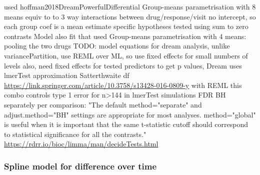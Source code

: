 \begin{outline}
\1 used  hoffman2018DreamPowerfulDifferential
\1 Group-means parametrisation with 8 means
    \2 equiv to to 3 way interactions between drug/response/visit
    \2 no intercept, so each group coef is a mean estimate
\1 specific hypotheses tested using sum to zero contrasts 
\1 Model also fit that used Group-means parametrisation with 4 means: pooling the two drugs
\1 TODO: model equations
    \2 for dream analysis, unlike variancePartition, use REML over ML, so use fixed effects for small numbers of levels
    \2 also, need fixed effects for tested predictors
    \2 to get p values, Dream uses lmerTest approximation Satterthwaite df \url{https://link.springer.com/article/10.3758/s13428-016-0809-y} with REML
    \2 this combo controls type 1 error for n>144 in lmerTest simulations
    \2 FDR BH separately per comparison: "The default method="separate" and adjust.method="BH" settings are appropriate for most analyses. method="global" is useful when it is important that the same t-statistic cutoff should correspond to statistical significance for all the contrasts." \url{https://rdrr.io/bioc/limma/man/decideTests.html}

\subsubsection{Spline model for difference over time}



\end{outline}
